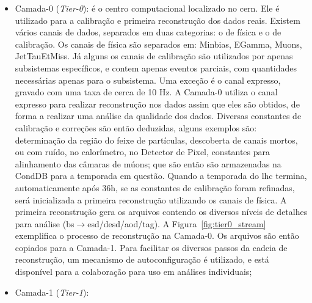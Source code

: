 \begin{itemize}
\item Camada-0 (\emph{Tier-0}): %
é o centro computacional localizado no \gls{cern}. Ele é utilizado para a
calibração e primeira reconstrução dos dados reais. Existem vários canais de dados, 
separados em duas categorias: o de física e o de calibração. Os canais de física são separados em:
Minbias, EGamma, Muons, JetTauEtMiss. Já alguns os canais de calibração são
utilizados por apenas subsistemas específicos, e contem apenas eventos parciais,
com quantidades necessárias apenas para o subsistema. Uma exceção é o canal 
expresso, gravado com uma taxa de cerca de 10 Hz. A Camada-0 utiliza o canal
expresso para realizar reconstrução nos dados assim que eles são obtidos, de
forma a realizar uma análise da qualidade dos dados.
Diversas constantes de calibração e correções são então deduzidas, 
alguns exemplos são: determinação da região do 
feixe de partículas, descoberta de canais mortos, ou com ruído,
no calorímetro, no Detector de Pixel, constantes para alinhamento das câmaras de
múons; que são então são armazenadas na CondDB para a temporada em questão. 
Quando a temporada do \gls{lhc} termina, automaticamente após 36h, se as
constantes de calibração foram refinadas, será inicializada a primeira 
reconstrução utilizando os canais de física. 
A primeira reconstrução gera os arquivos contendo os diversos níveis de 
detalhes para análise
(\gls{bs}$\rightarrow$\gls{esd}/\gls{desd}/\gls{aod}/\gls{tag}). A
Figura~\ref{fig:tier0_stream} exemplifica o processo de reconstrução na
Camada-0. Os arquivos são então copiados para a Camada-1.
Para facilitar os diversos passos da cadeia de reconstrução, 
um mecanismo de autoconfiguração \cite{recotrf} é utilizado, 
e está disponível para a colaboração para uso em análises individuais;
\item Camada-1 (\emph{Tier-1}): %

\end{itemize}
